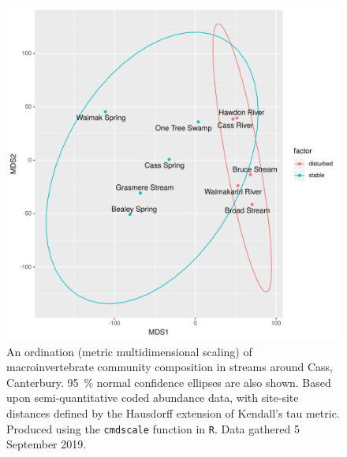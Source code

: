 \documentclass[a4paper,10pt]{article}
\newcommand\datadate{5 September 2019} %
\begin{document}
\begin{figure}[p]
	\centering
	\includegraphics[width=\textwidth]{site-ordination}
	\caption[Site ordination]{ %
		An ordination (metric multidimensional scaling) of macroinvertebrate community composition in streams around Cass, Canterbury.
		\SI{95}{\percent} normal confidence ellipses are also shown.
		Based upon semi-quantitative coded abundance data, with site-site distances defined by the Hausdorff extension of Kendall's tau metric.
		Produced using the \texttt{cmdscale} function in \texttt{R}.
		Data gathered {\datadate}.
	}\label{fig:site-ordination}
\end{figure}


\FloatBarrier
\printbibliography
\end{document}
